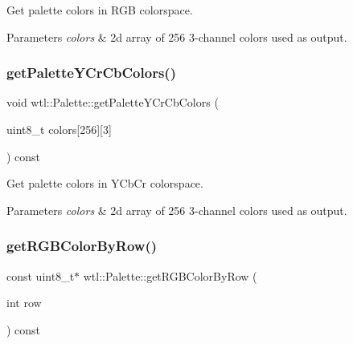Get palette colors in R\+GB colorspace. 


\begin{DoxyParams}{Parameters}
{\em colors} & 2d array of 256 3-\/channel colors used as output. \\
\hline
\end{DoxyParams}
\mbox{\label{classwtl_1_1_palette_a0a6e936380bbaed21b3bfbaf1a92637c}} 
\subsubsection{\texorpdfstring{get\+Palette\+Y\+Cr\+Cb\+Colors()}{getPaletteYCrCbColors()}}
{\footnotesize\ttfamily void wtl\+::\+Palette\+::get\+Palette\+Y\+Cr\+Cb\+Colors (\begin{DoxyParamCaption}\item[{uint8\+\_\+t}]{colors\mbox{[}256\mbox{]}\mbox{[}3\mbox{]} }\end{DoxyParamCaption}) const}



Get palette colors in Y\+Cb\+Cr colorspace. 


\begin{DoxyParams}{Parameters}
{\em colors} & 2d array of 256 3-\/channel colors used as output. \\
\hline
\end{DoxyParams}
\mbox{\label{classwtl_1_1_palette_a02df9e7df1e4e4507053939ae4e6f900}} 
\subsubsection{\texorpdfstring{get\+R\+G\+B\+Color\+By\+Row()}{getRGBColorByRow()}}
{\footnotesize\ttfamily const uint8\+\_\+t$\ast$ wtl\+::\+Palette\+::get\+R\+G\+B\+Color\+By\+Row (\begin{DoxyParamCaption}\item[{int}]{row }\end{DoxyParamCaption}) const}



